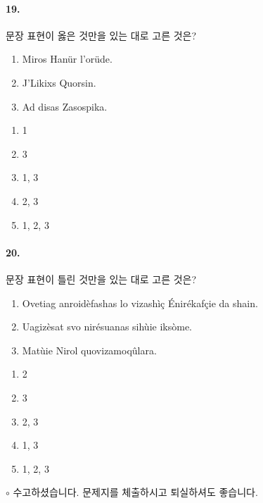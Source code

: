 \documentclass{article}
\begin{document}
\pagebreak

\paragraph{19.}
문장 표현이 옳은 것만을 있는 대로 고른 것은?

\begin{reminder}
    \begin{enumerate}
        \item Miros Hanür l'orüde.
        \item J'Likixs Quorsin.
        \item Ad disas Zasospika.
    \end{enumerate}
\end{reminder}

\begin{enumerate}
    \item 1
    \item 3
    \item 1, 3
    \item 2, 3
    \item 1, 2, 3
\end{enumerate}

\paragraph{20.}
문장 표현이 틀린 것만을 있는 대로 고른 것은?

\begin{reminder}
    \begin{enumerate}
        \item Ovetiag anroidèfashas lo vizashìç Énirékafçie da shain.
        \item Uagizèsat svo nirésuanas sihùie iksòme.
        \item Matùie Nirol quovizamoqûlara.
    \end{enumerate}
\end{reminder}

\begin{enumerate}
    \item 2
    \item 3
    \item 2, 3
    \item 1, 3
    \item 1, 2, 3
\end{enumerate}

\begin{reminder}
    $\circ$ 수고하셨습니다. 문제지를 체출하시고 퇴실하셔도 좋습니다.
\end{reminder}

\end{document}
